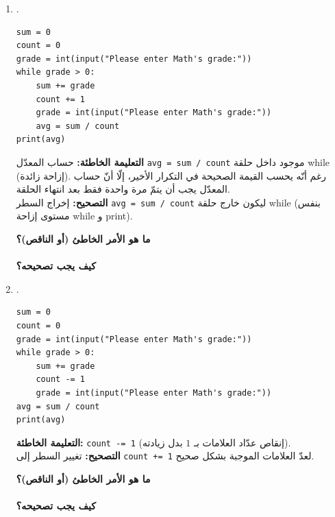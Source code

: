 \documentclass[14pt]{extarticle}
\begin{document}
\begin{enumerate}[label=\textbf{تمرين \arabic*:}, wide=0pt, itemsep=2.2em]
\begin{enumerate}[label=\textbf{مقطع \alph*:}, wide=0pt, itemsep=1.5em]
\item .
\begin{boxCode}
\begin{english}
\begin{verbatim}
sum = 0
count = 0
grade = int(input("Please enter Math's grade:"))
while grade > 0:
    sum += grade
    count += 1
    grade = int(input("Please enter Math's grade:"))
    avg = sum / count
print(avg)
\end{verbatim}
\end{english}
\end{boxCode}
\ifwithsols
\begin{boxSolution}
\textbf{التعليمة الخاطئة:} حساب المعدّل \textenglish{\texttt{avg = sum / count}} موجود داخل حلقة \textenglish{while} (إزاحة زائدة). رغم أنّه يحسب القيمة الصحيحة في التكرار الأخير، إلّا أنّ حساب المعدّل يجب أن يتمّ مرة واحدة فقط بعد انتهاء الحلقة. \\
\textbf{التصحيح:} إخراج السطر \textenglish{\texttt{avg = sum / count}} ليكون خارج حلقة \textenglish{while} (بنفس مستوى إزاحة \textenglish{while} و \textenglish{print}).
\end{boxSolution}
\else
\vspace{0.5cm}
\textbf{ما هو الأمر الخاطئ (أو الناقص)؟} \hrulefill \\
 \\
\textbf{كيف يجب تصحيحه؟} \hrulefill
\fi
\filbreak

\item .
\begin{boxCode}
\begin{english}
\begin{verbatim}
sum = 0
count = 0
grade = int(input("Please enter Math's grade:"))
while grade > 0:
    sum += grade
    count -= 1
    grade = int(input("Please enter Math's grade:"))
avg = sum / count
print(avg)
\end{verbatim}
\end{english}
\end{boxCode}
\ifwithsols
\begin{boxSolution}
\textbf{التعليمة الخاطئة:} \textenglish{\texttt{count -= 1}} (إنقاص عدّاد العلامات بـ $1$ بدل زيادته). \\
\textbf{التصحيح:} تغيير السطر إلى \textenglish{\texttt{count += 1}} لعدّ العلامات الموجبة بشكل صحيح.
\end{boxSolution}
\else
\vspace{0.5cm}
\textbf{ما هو الأمر الخاطئ (أو الناقص)؟} \hrulefill \\
 \\
\textbf{كيف يجب تصحيحه؟} \hrulefill
\fi
\filbreak


\end{enumerate}
\end{enumerate}
\end{document}
